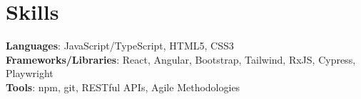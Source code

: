 \documentclass[letterpaper,11pt]{article}
\begin{document}
\section{Skills}
\begin{itemize}[leftmargin=0.15in, label={}]
  \small{\item{
        \textbf{Languages}{: JavaScript/TypeScript, HTML5, CSS3} \\
        \textbf{Frameworks/Libraries}{: React, Angular, Bootstrap, Tailwind, RxJS, Cypress, Playwright} \\
        \textbf{Tools}{: npm, git, RESTful APIs, Agile Methodologies}
        }}
\end{itemize}
\end{document}
